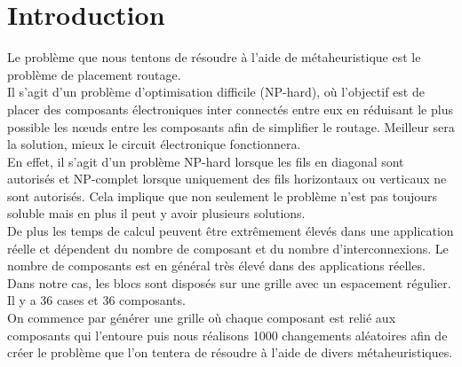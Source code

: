 \section{Introduction}

Le problème que nous tentons de résoudre à l'aide de métaheuristique est le problème de placement routage. \\

Il s'agit d'un problème d'optimisation difficile (NP-hard), où l'objectif est de placer des composants électroniques inter connectés entre eux en réduisant le plus possible les nœuds entre les composants afin de simplifier le routage. Meilleur sera la solution, mieux le circuit électronique fonctionnera. \\

En effet, il s'agit d'un problème NP-hard lorsque les fils en diagonal sont autorisés et NP-complet lorsque uniquement des fils horizontaux ou verticaux ne sont autorisés. Cela implique que non seulement le problème n'est pas toujours soluble mais en plus il peut y avoir plusieurs solutions. \\

De plus les temps de calcul peuvent être extrêmement élevés dans une application réelle et dépendent du nombre de composant et du nombre d'interconnexions. Le nombre de composants est en général très élevé dans des applications réelles. \\

Dans notre cas, les blocs sont disposés sur une grille avec un espacement régulier. Il y a 36 cases et 36 composants.\\

On commence par générer une grille où chaque composant est relié aux composants qui l'entoure puis nous réalisons 1000 changements aléatoires afin de créer le problème que l'on tentera de résoudre à l'aide de divers métaheuristiques.

\newpage

